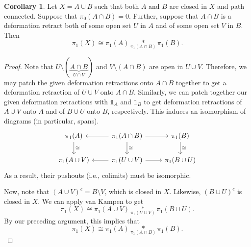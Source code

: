 \documentclass[10pt,letterpaper,cm]{nupset}
\theoremstyle{definition}
\theoremstyle{theorem}
\newtheorem{corollary}[definition]{Corollary}
\theoremstyle{remark}
\newcommand{\1}{\mathbb{1}}
\newcommand{\0}{\vec 0}
\begin{document}
\begin{corollary}
Let $X = A\cup B$ such that both $A$ and $B$ are closed in $X$ and path connected. Suppose that $\pi_0(A\cap B) =0$. Further, suppose that $A \cap B$ is a deformation retract both of some open set $U$ in $A$ and of some open set $V$ in $B$. Then $$\pi_1(X) \cong \pi_1(A) \underset{\pi_1(A\cap B)}{\ast} \pi_1(B).$$
\end{corollary}
\begin{proof}
Note that $U \setminus (\underbrace{A \cap B}_{U \cap V})$ and $V \setminus (A \cap B)$ are open in $U \cup V$. Therefore, we may patch the given deformation retractions onto $A \cap B$ together to get a deformation retraction of $U \cup V$ onto $A \cap B$. Similarly, we can patch together our given deformation retractions with $\1_A$ and $\1_B$ to get deformation retractions of $A\cup V$ onto $A$ and of $B\cup U$ onto $B$, respectively. 
This induces an isomorphism of diagrams (in particular, spans).
\[
\begin{tikzcd}
\pi_1(A) \arrow[d, "\cong"] & \pi_1(A \cap B) \arrow[d, "\cong"]  \arrow[r] \arrow[l] & \pi_1(B) \arrow[d, "\cong"] \\
\pi_1(A \cup V) & \pi_1(U \cup V) \arrow[l] \arrow[r] & \pi_1(B \cup U) 
\end{tikzcd}
\] As a result, their pushouts (i.e., colimits) must be isomorphic. 

\medskip

 Now, note that $\left(A \cup V\right)^c = B \setminus V$, which  is closed in $X$. Likewise, $\left(B \cup U\right)^c$ is closed in $X$. We can apply van Kampen to get
$$  \pi_1(X) \cong \pi_1(A\cup V) \underset{\pi_1(U \cup V)}{\ast} \pi_1(B \cup U) .$$ By our preceding argument, this implies that $$  \pi_1(X)  \cong \pi_1(A) \underset{\pi_1(A \cap B)}{\ast} \pi_1(B) .$$
\end{proof}
\end{document}
